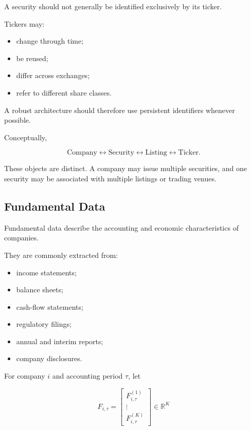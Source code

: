 \documentclass[11pt,a4paper]{article}
\begin{document}
A security should not generally be identified exclusively by its ticker.

Tickers may:

\begin{itemize}
    \item change through time;
    \item be reused;
    \item differ across exchanges;
    \item refer to different share classes.
\end{itemize}

A robust architecture should therefore use persistent identifiers whenever
possible.

Conceptually,

\begin{equation}
\boxed{
\text{Company}
\longleftrightarrow
\text{Security}
\longleftrightarrow
\text{Listing}
\longleftrightarrow
\text{Ticker}.
}
\end{equation}

These objects are distinct. A company may issue multiple securities, and one
security may be associated with multiple listings or trading venues.


\subsection{Fundamental Data}
\label{subsec:fundamental_data}

Fundamental data describe the accounting and economic characteristics of
companies.

They are commonly extracted from:

\begin{itemize}
    \item income statements;
    \item balance sheets;
    \item cash-flow statements;
    \item regulatory filings;
    \item annual and interim reports;
    \item company disclosures.
\end{itemize}

For company $i$ and accounting period $\tau$, let

\begin{equation}
F_{i,\tau}
=
\begin{bmatrix}
F_{i,\tau}^{(1)}\\
\vdots\\
F_{i,\tau}^{(K)}
\end{bmatrix}
\in
\mathbb{R}^{K}
\end{equation}
\end{document}
